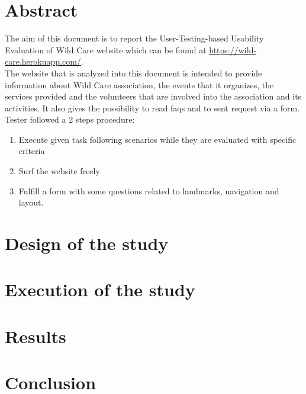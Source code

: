 \documentclass[11pt, a4paperm, hidelinks]{article}
\begin{document}
	\section{Abstract}
	The aim of this document is to report the User-Testing-based Usability Evaluation of Wild Care website which can be found at 	\url{https://wild-care.herokuapp.com/}.	\\ The website that is analyzed into this document is intended to provide 				information about Wild Care association, the events that it organizes, the services provided and the volunteers that are 			involved into the association and its activities. It also gives the possibility to read faqs and to sent request via a form.\\
 	Tester followed a 2 steps procedure:
	\begin{enumerate}
		\item Execute given task following scenarios while they are evaluated with specific criteria
		\item Surf the website freely
		\item Fulfill a form with some questions related to landmarks, navigation and layout.
	\end{enumerate}	

	\section{Design of the study}
	


	\section{Execution of the study}
	


	\section{Results}
	
	\clearpage


	\section{Conclusion}	
	\clearpage
\end{document}
